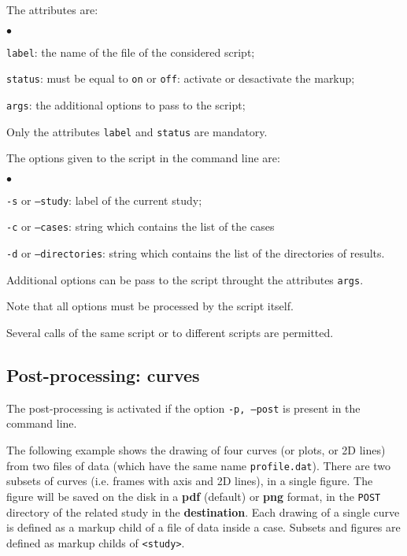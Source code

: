 \documentclass[a4paper,10pt,twoside]{csshortdoc}
\begin{document}
The attributes are:
\begin{list}{$\bullet$}{}
\item \texttt{label}: the name of the file of the considered script;
\item \texttt{status}: must be equal to \texttt{on} or \texttt{off}:
activate or desactivate the markup;
\item \texttt{args}: the additional options to pass to the script;
\end{list}

Only the attributes \texttt{label} and \texttt{status} are mandatory.

The options given to the script in the command line are:
\begin{list}{$\bullet$}{}
\item \texttt{-s} or \texttt{--study}: label of the current study;
\item \texttt{-c} or \texttt{--cases}: string which contains the list of the cases
\item \texttt{-d} or \texttt{--directories}: string which contains the list
of the directories of results.
\end{list}
Additional options can be pass to the script throught the attributes \texttt{args}.

Note that all options must be processed by the script itself.

Several calls of the same script or to different scripts are permitted.

\subsection{Post-processing: curves}\label{sec:curves}

The post-processing is activated if the option \texttt{-p, --post} is present
in the command line.

The following example shows the drawing of four curves (or plots, or 2D lines)
from two files of data (which have the same name \texttt{profile.dat}). There
are two subsets of curves (i.e. frames with axis and 2D lines), in a single
figure. The figure will be saved on the disk in a \textbf{pdf} (default)
or \textbf{png} format, in the \texttt{POST} directory of the related study
in the \textbf{destination}. Each drawing of a single curve is defined as a
markup child of a file of data inside a case. Subsets and figures are defined
as markup childs of \texttt{<study>}.
\end{document}
